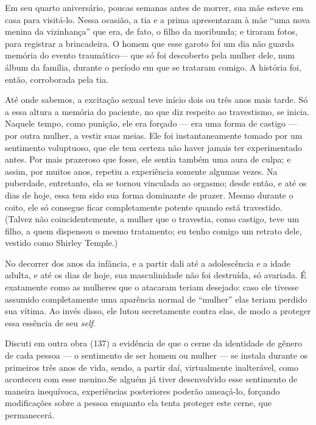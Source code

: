 Em seu quarto aniversário, poucas semanas antes de morrer, sua mãe
esteve em casa para visitá-lo. Nessa ocasião, a tia e a prima
apresentaram à mãe ``uma nova menina da
vizinhança'' que era, de fato, o filho da moribunda; e
tiraram fotos, para registrar a brincadeira. O homem que esse garoto
foi um dia não guarda memória do evento traumático\idxtravetrau[|(] --- que só foi
descoberto pela mulher dele, num álbum da família, durante o período em
que se trataram comigo. A história foi, então, corroborada pela tia.

Até onde sabemos, a excitação sexual teve início dois\idxtravemperi{} ou três anos
mais tarde. Só a essa altura a memória do paciente, no que diz respeito
ao travestismo, se inicia. Naquele tempo, como punição, ele era forçado
--- era uma forma de castigo --- por outra mulher, a vestir suas
meias. Ele foi instantaneamente tomado por um sentimento voluptuoso,
que ele tem certeza não haver jamais ter experimentado antes. Por mais
prazeroso que fosse, ele sentia também uma aura de culpa;\idxculpa{} e assim, por
muitos anos, repetiu a experiência somente algumas vezes. Na puberdade,
entretanto, ela se tornou vinculada ao orgasmo; desde então, e até os
dias de hoje, essa tem sido sua forma dominante de prazer. Mesmo
durante o coito, ele só consegue ficar completamente potente quando
está travestido. (Talvez não coincidentemente, a mulher que o
travestia, como castigo, teve um filho, a quem dispensou o mesmo
tratamento; eu tenho comigo um retrato dele, vestido como Shirley
Temple.)

No decorrer dos anos da infância, e a partir dali até a
adolescência e a idade adulta, e até os dias de hoje, sua
masculinidade não foi destruída, só avariada. É exatamente como as
mulheres que o atacaram teriam desejado: caso ele tivesse assumido
completamente uma aparência normal de
``mulher'' elas teriam perdido sua vítima.
Ao invés disso, ele lutou secretamente contra elas, de modo a proteger
essa essência de seu \textit{self}.\idxmascuhum[|)]

Discuti em outra obra (137) a evidência de que o cerne da identidade
de gênero de cada pessoa --- o sentimento de ser homem ou mulher ---
se instala durante os primeiros três anos de vida, sendo, a partir daí,
 virtualmente inalterável, como aconteceu com esse menino.\idxcond[|(] Se alguém já
tiver desenvolvido esse sentimento de maneira inequívoca, experiências
posteriores poderão ameaçá-lo, forçando modificações sobre a pessoa
enquanto ela tenta proteger este cerne, que permanecerá.

